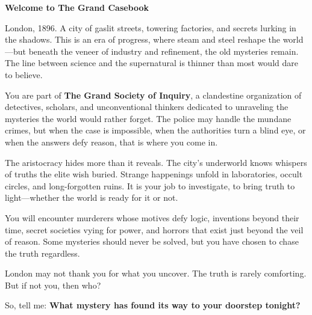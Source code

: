 \documentclass[nodeprecatedcode,bg=print]{dndbook}
\begin{document}
\Large
\textbf{Welcome to The Grand Casebook}

London, 1896. A city of gaslit streets, towering factories, and secrets lurking in the shadows. This is an era of progress, where steam and steel reshape the world—but beneath the veneer of industry and refinement, the old mysteries remain. The line between science and the supernatural is thinner than most would dare to believe.

You are part of \textbf{The Grand Society of Inquiry}, a clandestine organization of detectives, scholars, and unconventional thinkers dedicated to unraveling the mysteries the world would rather forget. The police may handle the mundane crimes, but when the case is impossible, when the authorities turn a blind eye, or when the answers defy reason, that is where you come in.

The aristocracy hides more than it reveals. The city’s underworld knows whispers of truths the elite wish buried. Strange happenings unfold in laboratories, occult circles, and long-forgotten ruins. It is your job to investigate, to bring truth to light—whether the world is ready for it or not.

You will encounter murderers whose motives defy logic, inventions beyond their time, secret societies vying for power, and horrors that exist just beyond the veil of reason. Some mysteries should never be solved, but you have chosen to chase the truth regardless.

London may not thank you for what you uncover. The truth is rarely comforting. But if not you, then who?

So, tell me: \textbf{What mystery has found its way to your doorstep tonight?}
\end{document}
